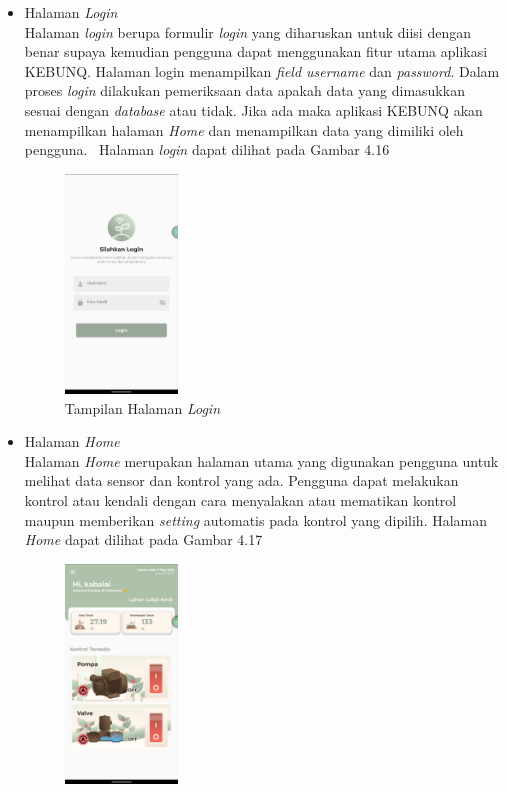 \begin{flushleft}
\begin{justify}
\begin{enumerate}
\begin{itemize}
                \item Halaman \emph{Login}\\
                Halaman \emph{login} berupa formulir \emph{login} yang diharuskan untuk diisi dengan benar supaya kemudian pengguna dapat menggunakan fitur utama aplikasi KEBUNQ. Halaman login menampilkan \emph{field username} dan \emph{password}.
                Dalam proses \emph{login} dilakukan pemeriksaan data apakah data yang dimasukkan sesuai dengan \emph{database} atau tidak. Jika ada maka aplikasi KEBUNQ akan menampilkan halaman \emph{Home} dan menampilkan data yang dimiliki oleh pengguna. \
                Halaman \emph{login} dapat dilihat pada Gambar 4.16
                \begin{figure}[ht]
                    \centering
                    \includegraphics[width=3cm]{images/bab 4/login.jpeg}
                    \caption{Tampilan Halaman \emph{Login}}
                \end{figure}
                \vspace{10cm}
                \item Halaman \emph{Home}\\
                Halaman \emph{Home} merupakan halaman utama yang digunakan pengguna untuk melihat data sensor dan kontrol yang ada. Pengguna dapat melakukan kontrol atau kendali dengan cara menyalakan atau mematikan kontrol maupun memberikan \emph{setting} automatis pada kontrol yang dipilih.
                Halaman \emph{Home} dapat dilihat pada Gambar 4.17
                \begin{figure}[ht]
                    \centering
                    \includegraphics[width=3cm]{images/bab 4/home.jpeg}

\end{figure}
\end{itemize}
\end{enumerate}
\end{justify}
\end{flushleft}

